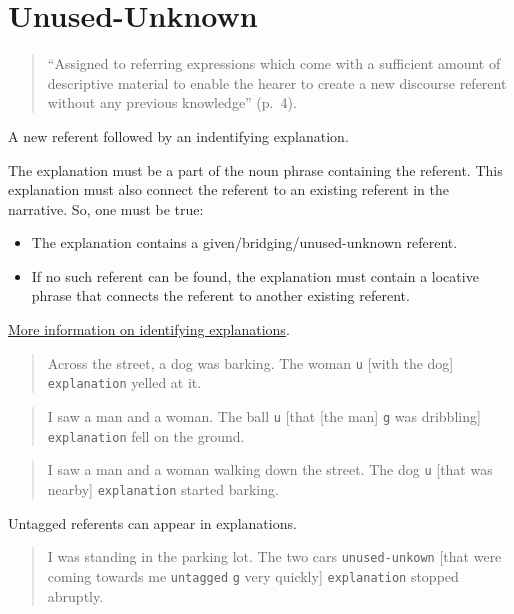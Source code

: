 \documentclass[
]{book}
\providecommand{\tightlist}{%
  \setlength{\itemsep}{0pt}\setlength{\parskip}{0pt}}
\begin{document}
\hypertarget{unused-unknown}{%
\section{Unused-Unknown}\label{unused-unknown}}

\begin{quote}
``Assigned to referring expressions which come with a sufficient amount of descriptive material to enable the hearer to create a new discourse referent without any previous knowledge'' (p.~4).
\end{quote}

A new referent followed by an indentifying explanation.

The explanation must be a part of the noun phrase containing the referent.
This explanation must also connect the referent to an existing referent in the narrative.
So, one must be true:

\begin{itemize}
\tightlist
\item
  The explanation contains a given/bridging/unused-unknown referent.
\item
  If no such referent can be found,
  the explanation must contain a locative phrase
  that connects the referent to another existing referent.
\end{itemize}

\protect\hyperlink{referent-explanation-test}{More information on identifying explanations}.

\begin{quote}
Across the street, a dog was barking.
The woman \texttt{u} {[}with the dog{]} \texttt{explanation} yelled at it.
\end{quote}

\begin{quote}
I saw a man and a woman.
The ball \texttt{u} {[}that {[}the man{]} \texttt{g} was dribbling{]} \texttt{explanation} fell on the ground.
\end{quote}

\begin{quote}
I saw a man and a woman walking down the street.
The dog \texttt{u} {[}that was nearby{]} \texttt{explanation} started barking.
\end{quote}

Untagged referents can appear in explanations.

\begin{quote}
I was standing in the parking lot.
The two cars \texttt{unused-unkown} {[}that were coming towards me \texttt{untagged} \texttt{g} very quickly{]} \texttt{explanation} stopped abruptly.
\end{quote}
\end{document}

